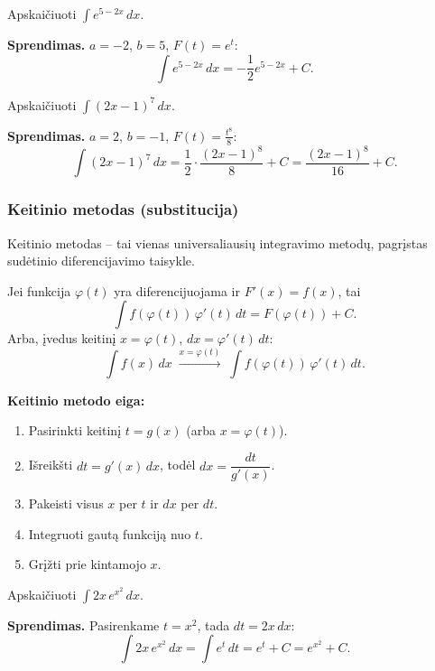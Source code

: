 \begin{example}
Apskaičiuoti $\displaystyle\int e^{5-2x}\,dx$.

\textbf{Sprendimas.} $a=-2$, $b=5$, $F(t)=e^t$:
\[
\int e^{5-2x}\,dx = -\frac{1}{2}e^{5-2x}+C.
\]
\end{example}

\begin{example}
Apskaičiuoti $\displaystyle\int (2x-1)^7\,dx$.

\textbf{Sprendimas.} $a=2$, $b=-1$, $F(t)=\frac{t^8}{8}$:
\[
\int (2x-1)^7\,dx = \frac{1}{2}\cdot\frac{(2x-1)^8}{8}+C = \frac{(2x-1)^8}{16}+C.
\]
\end{example}

\subsubsection{Keitinio metodas (substitucija)}

Keitinio metodas – tai vienas universaliausių integravimo metodų, pagrįstas sudėtinio diferencijavimo taisykle.

\begin{theorem}
Jei funkcija $\varphi(t)$ yra diferencijuojama ir $F'(x)=f(x)$, tai
\[
\int f(\varphi(t))\,\varphi'(t)\,dt = F(\varphi(t))+C.
\]
Arba, įvedus keitinį $x=\varphi(t)$, $dx=\varphi'(t)\,dt$:
\[
\int f(x)\,dx \;\xrightarrow{x=\varphi(t)}\; \int f(\varphi(t))\,\varphi'(t)\,dt.
\]
\end{theorem}

\textbf{Keitinio metodo eiga:}
\begin{enumerate}[label=\arabic*.]
  \item Pasirinkti keitinį $t = g(x)$ (arba $x = \varphi(t)$).
  \item Išreikšti $dt = g'(x)\,dx$, todėl $dx = \dfrac{dt}{g'(x)}$.
  \item Pakeisti visus $x$ per $t$ ir $dx$ per $dt$.
  \item Integruoti gautą funkciją nuo $t$.
  \item Grįžti prie kintamojo $x$.
\end{enumerate}

\begin{example}
Apskaičiuoti $\displaystyle\int 2x\,e^{x^2}\,dx$.

\textbf{Sprendimas.} Pasirenkame $t = x^2$, tada $dt = 2x\,dx$:
\[
\int 2x\,e^{x^2}\,dx = \int e^t\,dt = e^t+C = e^{x^2}+C.
\]
\end{example}

